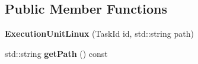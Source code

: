 \subsection*{Public Member Functions}
\begin{DoxyCompactItemize}
\item 
\hypertarget{classmammut_1_1task_1_1ExecutionUnitLinux_a0b8bcbd22e29b934c8520cd508afaeef}{{\bfseries Execution\-Unit\-Linux} (Task\-Id id, std\-::string path)}\label{classmammut_1_1task_1_1ExecutionUnitLinux_a0b8bcbd22e29b934c8520cd508afaeef}

\item 
\hypertarget{classmammut_1_1task_1_1ExecutionUnitLinux_ab71c03f6a608451a9c6132270871800d}{std\-::string {\bfseries get\-Path} () const }\label{classmammut_1_1task_1_1ExecutionUnitLinux_ab71c03f6a608451a9c6132270871800d}


\end{DoxyCompactItemize}

